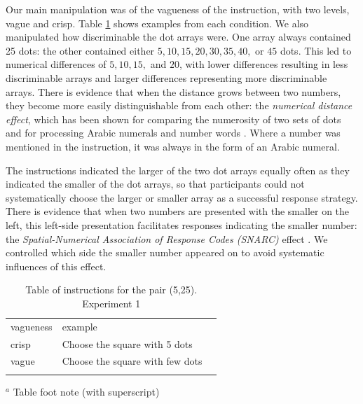 \documentclass[graybox,envcountchap,sectrefs%
,footinfo
]{svmono}
\begin{document}
Our main manipulation was of the vagueness of the instruction, with two levels, vague and crisp. Table \ref{instructionse1} shows examples from each condition.  We also manipulated how discriminable the dot arrays were. One array always contained 25 dots: the other contained either $5, 10, 15, 20, 30, 35, 40,$ or $45$ dots. This led to numerical differences of $5, 10, 15,$ and $20$, with lower differences resulting in less discriminable arrays and larger differences representing more discriminable arrays. There is evidence that when the distance grows between two numbers, they become more easily distinguishable from each other: the \emph{numerical distance effect}, which has been shown for comparing the numerosity of two sets of dots \citep{van123} and for processing Arabic numerals and number words \citep{Dehaene199647}. Where a number was mentioned in the instruction, it was always in the form of an Arabic numeral.

The instructions indicated the larger of the two dot arrays equally often as they indicated the smaller of the dot arrays, so that participants could not systematically choose the larger or smaller array as a successful response strategy. There is evidence that when two numbers are presented with the smaller on the left, this left-side presentation facilitates responses indicating the smaller number: the \emph{Spatial-Numerical Association of Response Codes (SNARC)} effect \citep{dehaene1993mental, gevers2006automatic}. We controlled which side the smaller number appeared on to avoid systematic influences of this effect. 

\begin{table}
\caption{Table of instructions for the pair (5,25). Experiment 1}
\label{instructionse1} 
\begin{tabular}{lll}
\hline\noalign{\smallskip}
vagueness&example\\
\noalign{\smallskip}\svhline\noalign{\smallskip}
crisp 	& 	Choose the square with 5 dots \\
vague	&	Choose the square with few dots\\
\noalign{\smallskip}\hline\noalign{\smallskip}
\end{tabular}
$^a$ Table foot note (with superscript)\\
\end{table}
\end{document}

